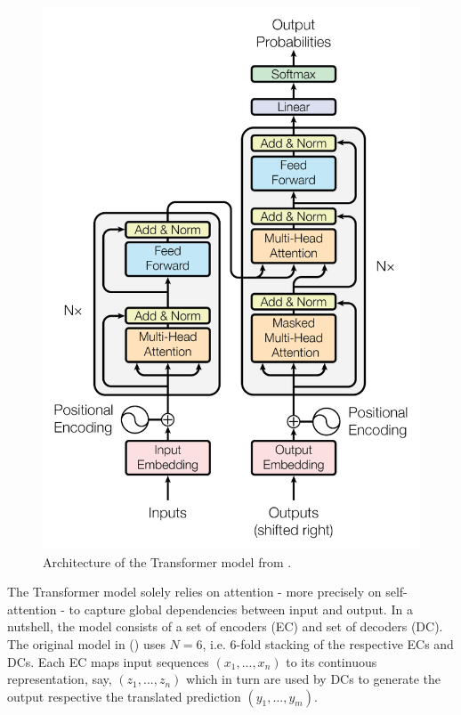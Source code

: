 \documentclass[11pt,a4paper]{article}
\begin{document}
\begin{figure}[ht]
    \centering
    \includegraphics[scale=0.5]{images/Transformer.PNG}
    \caption{Architecture of the Transformer model from \cite{transformer}.}
    \label{fig:transformer}
\end{figure}

The Transformer model solely relies on attention - more precisely on self-attention - to capture global dependencies between input and output. In a nutshell, the model consists of a set of encoders (EC) and set of decoders (DC). The original model in (\citet{transformer}) uses $N=6$, i.e. 6-fold stacking of the respective ECs and DCs. Each EC maps input sequences $(x_1,...,x_n)$ to its continuous representation, say, $(z_1,...,z_n)$ which in turn are used by DCs to generate the output respective the translated prediction $(y_1,...,y_m)$.
\end{document}
